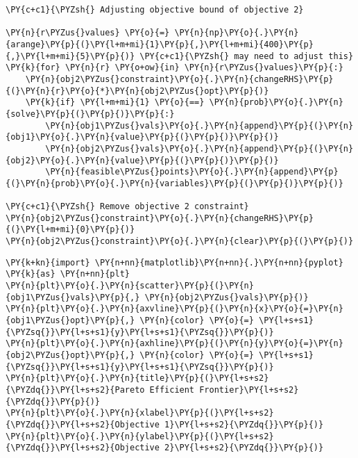     \begin{tcolorbox}[breakable, size=fbox, boxrule=1pt, pad at break*=1mm,colback=cellbackground, colframe=cellborder]
\begin{Verbatim}[commandchars=\\\{\}]
\PY{c+c1}{\PYZsh{} Adjusting objective bound of objective 2}

\PY{n}{r\PYZus{}values} \PY{o}{=} \PY{n}{np}\PY{o}{.}\PY{n}{arange}\PY{p}{(}\PY{l+m+mi}{1}\PY{p}{,}\PY{l+m+mi}{400}\PY{p}{,}\PY{l+m+mi}{5}\PY{p}{)} \PY{c+c1}{\PYZsh{} may need to adjust this}
\PY{k}{for} \PY{n}{r} \PY{o+ow}{in} \PY{n}{r\PYZus{}values}\PY{p}{:}
    \PY{n}{obj2\PYZus{}constraint}\PY{o}{.}\PY{n}{changeRHS}\PY{p}{(}\PY{n}{r}\PY{o}{*}\PY{n}{obj2\PYZus{}opt}\PY{p}{)}
    \PY{k}{if} \PY{l+m+mi}{1} \PY{o}{==} \PY{n}{prob}\PY{o}{.}\PY{n}{solve}\PY{p}{(}\PY{p}{)}\PY{p}{:}
        \PY{n}{obj1\PYZus{}vals}\PY{o}{.}\PY{n}{append}\PY{p}{(}\PY{n}{obj1}\PY{o}{.}\PY{n}{value}\PY{p}{(}\PY{p}{)}\PY{p}{)}
        \PY{n}{obj2\PYZus{}vals}\PY{o}{.}\PY{n}{append}\PY{p}{(}\PY{n}{obj2}\PY{o}{.}\PY{n}{value}\PY{p}{(}\PY{p}{)}\PY{p}{)}
        \PY{n}{feasible\PYZus{}points}\PY{o}{.}\PY{n}{append}\PY{p}{(}\PY{n}{prob}\PY{o}{.}\PY{n}{variables}\PY{p}{(}\PY{p}{)}\PY{p}{)}

\PY{c+c1}{\PYZsh{} Remove objective 2 constraint}
\PY{n}{obj2\PYZus{}constraint}\PY{o}{.}\PY{n}{changeRHS}\PY{p}{(}\PY{l+m+mi}{0}\PY{p}{)}
\PY{n}{obj2\PYZus{}constraint}\PY{o}{.}\PY{n}{clear}\PY{p}{(}\PY{p}{)}
\end{Verbatim}
\end{tcolorbox}

    \begin{tcolorbox}[breakable, size=fbox, boxrule=1pt, pad at break*=1mm,colback=cellbackground, colframe=cellborder]
\begin{Verbatim}[commandchars=\\\{\}]
\PY{k+kn}{import} \PY{n+nn}{matplotlib}\PY{n+nn}{.}\PY{n+nn}{pyplot} \PY{k}{as} \PY{n+nn}{plt}
\PY{n}{plt}\PY{o}{.}\PY{n}{scatter}\PY{p}{(}\PY{n}{obj1\PYZus{}vals}\PY{p}{,} \PY{n}{obj2\PYZus{}vals}\PY{p}{)}
\PY{n}{plt}\PY{o}{.}\PY{n}{axvline}\PY{p}{(}\PY{n}{x}\PY{o}{=}\PY{n}{obj1\PYZus{}opt}\PY{p}{,} \PY{n}{color} \PY{o}{=} \PY{l+s+s1}{\PYZsq{}}\PY{l+s+s1}{y}\PY{l+s+s1}{\PYZsq{}}\PY{p}{)}
\PY{n}{plt}\PY{o}{.}\PY{n}{axhline}\PY{p}{(}\PY{n}{y}\PY{o}{=}\PY{n}{obj2\PYZus{}opt}\PY{p}{,} \PY{n}{color} \PY{o}{=} \PY{l+s+s1}{\PYZsq{}}\PY{l+s+s1}{y}\PY{l+s+s1}{\PYZsq{}}\PY{p}{)}
\PY{n}{plt}\PY{o}{.}\PY{n}{title}\PY{p}{(}\PY{l+s+s2}{\PYZdq{}}\PY{l+s+s2}{Pareto Efficient Frontier}\PY{l+s+s2}{\PYZdq{}}\PY{p}{)}
\PY{n}{plt}\PY{o}{.}\PY{n}{xlabel}\PY{p}{(}\PY{l+s+s2}{\PYZdq{}}\PY{l+s+s2}{Objective 1}\PY{l+s+s2}{\PYZdq{}}\PY{p}{)}
\PY{n}{plt}\PY{o}{.}\PY{n}{ylabel}\PY{p}{(}\PY{l+s+s2}{\PYZdq{}}\PY{l+s+s2}{Objective 2}\PY{l+s+s2}{\PYZdq{}}\PY{p}{)}
\end{Verbatim}
\end{tcolorbox}

